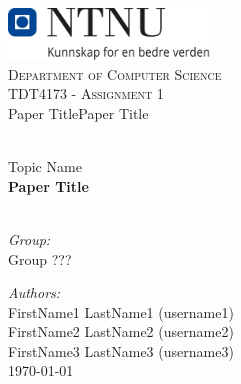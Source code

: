 


\def\TOPIC{Topic Name}

\def\TITLE{Paper Title}

\def\GROUP{Group ???}

\def\AUTHORS{
    FirstName1 LastName1 (username1) \\
    FirstName2 LastName2 (username2) \\
    FirstName3 LastName3 (username3) \\
}



\begin{titlepage}

\vbox{ }

\vbox{ }

\begin{center}
\includegraphics[width=0.40\textwidth]{Images/NTNU_logo.png}\\[1cm]
\textsc{\LARGE Department of Computer Science}\\[1.0cm]
\textsc{\Large TDT4173 - Assignment 1}\\[0.5cm]


\def\checktitle{Paper Title}
\ifx\TITLE\checktitle
\fi

\vbox{ }
\HRule \\[0.4cm]
{ \large \TOPIC } \\[0.3cm]
{ \huge \bfseries \TITLE}\\[0.4cm]
\HRule \\[1.5cm]
\large

\emph{Group:}\\
\GROUP

\emph{Authors:}\\
\AUTHORS


\vfill
{\large \today}
\end{center}
\end{titlepage}








